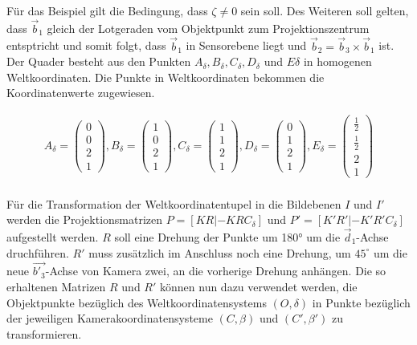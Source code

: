 Für das Beispiel gilt die Bedingung, dass $\zeta \neq 0$ sein soll. Des Weiteren soll gelten, dass  \ensuremath{\vec{b}_1} gleich der Lotgeraden vom Objektpunkt zum Projektionszentrum entsptricht und somit folgt, dass \ensuremath{\vec{b}_1} in Sensorebene liegt und \ensuremath{\vec{b}_2 = \vec{b}_3 \times \vec{b}_1} ist. Der Quader besteht aus den Punkten $A_\delta,B_\delta,C_\delta, D_\delta$ und $E\delta$ in homogenen Weltkoordinaten. Die Punkte in Weltkoordinaten bekommen die Koordinatenwerte zugewiesen. 

\begin{gather}
A_\delta=\begin{pmatrix}
0\\0\\2\\1
\end{pmatrix}, 
B_\delta=
\begin{pmatrix}
1\\0\\2\\1
\end{pmatrix},
C_\delta=
\begin{pmatrix}
1\\1\\2\\1
\end{pmatrix},
D_\delta=
\begin{pmatrix}
0\\1\\2\\1
\end{pmatrix},
E_\delta=
\begin{pmatrix}
\frac{1}{2}\\\frac{1}{2}\\2\\1
\end{pmatrix}
\end{gather}\\

Für die Transformation der Weltkoordinatentupel in die Bildebenen $I$ und $I'$ werden die Projektionsmatrizen $P=[KR|-KRC_\delta]$ und $P'=[K'R'|-K'R'C_\delta]$ aufgestellt werden. \ensuremath{R} soll eine Drehung der Punkte um 180° um die \ensuremath{\vec{d}_1}-Achse druchführen. \ensuremath{R'} muss zusätzlich im Anschluss noch eine Drehung, um \ensuremath{45^\circ} um die neue $\vec{b'_3}$-Achse von Kamera zwei, an die vorherige Drehung anhängen. Die so erhaltenen Matrizen \ensuremath{R} und \ensuremath{R'} können nun dazu verwendet werden, die Objektpunkte bezüglich des Weltkoordinatensystems $(O,\delta)$ in Punkte bezüglich der jeweiligen Kamerakoordinatensysteme $(C,\beta)$ und $(C',\beta')$ zu transformieren.


